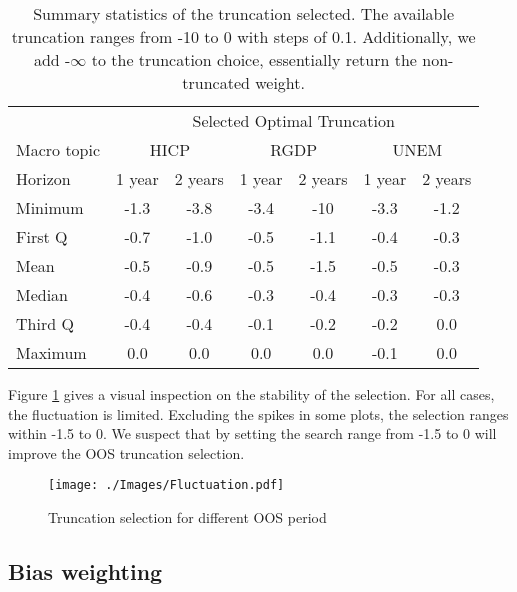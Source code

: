 \documentclass[11pt]{article}
\begin{document}
\begin{table}[!h]
	\centering
	\caption{Summary statistics of the truncation selected. The available truncation ranges from -10 to 0 with steps of 0.1. Additionally, we add -$\infty$ to the truncation choice, essentially return the non-truncated weight.}
	\label{tab: truncation summary statistics}
	\begin{tabular}{lcccccc}%
		\hline
		&\multicolumn{6}{c}{Selected Optimal Truncation}\\
		\cmidrule(lr){2-7}
		Macro topic & \multicolumn{2}{c}{HICP} & \multicolumn{2}{c}{RGDP} & \multicolumn{2}{c}{UNEM} \\
		\cmidrule(lr){2-3} \cmidrule(lr){4-5}\cmidrule(lr){6-7}
		Horizon     & 1 year & 2 years & 1 year & 2 years & 1 year & 2 years \\ 
		\hline
		Minimum     & -1.3        & -3.8        & -3.4        & -10         & -3.3        & -1.2        \\
		First Q     & -0.7        & -1.0        & -0.5        & -1.1        & -0.4        & -0.3        \\
		Mean        & -0.5        & -0.9        & -0.5        & -1.5        & -0.5        & -0.3        \\
		Median      & -0.4        & -0.6        & -0.3        & -0.4        & -0.3        & -0.3        \\
		Third Q     & -0.4        & -0.4        & -0.1        & -0.2        & -0.2        & 0.0         \\
		Maximum     & 0.0         & 0.0         & 0.0         & 0.0         & -0.1         & 0.0         \\ 
		\hline
	\end{tabular}
\end{table}

Figure \ref{fig: fluctuation} gives a visual inspection on the stability of the selection. For all cases, the fluctuation is limited. Excluding the spikes in some plots, the selection ranges within -1.5 to 0. We suspect that by setting the search range from -1.5 to 0 will improve the OOS truncation selection. 

\begin{figure}[!h]
	\centering
	\texttt{[image: ./Images/Fluctuation.pdf]}
	\caption{Truncation selection for different OOS period}\label{fig: fluctuation}
\end{figure}

\subsection{Bias weighting}\label{bias-weighting}
\end{document}
